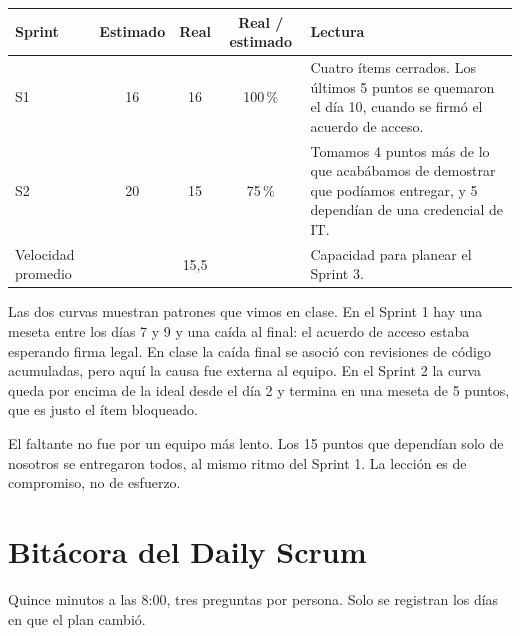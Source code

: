 \documentclass[10pt,a4paper]{article}
\begin{document}
\vspace{-8pt}
{\small
\begin{tabularx}{\linewidth}{@{}l c c c L@{}}
\toprule
Sprint & Estimado & Real & Real / estimado & Lectura \\
\midrule
S1 & 16 & 16 & 100\,\% & Cuatro ítems cerrados. Los últimos 5 puntos se quemaron el día 10, cuando se firmó el acuerdo de acceso. \\
S2 & 20 & 15 & 75\,\% & Tomamos 4 puntos más de lo que acabábamos de demostrar que podíamos entregar, y 5 dependían de una credencial de IT. \\
\midrule
Velocidad promedio & & 15,5 & & Capacidad para planear el Sprint 3. \\
\bottomrule
\end{tabularx}}

Las dos curvas muestran patrones que vimos en clase. En el Sprint 1 hay una meseta entre los días 7 y 9 y una caída
al final: el acuerdo de acceso estaba esperando firma legal. En clase la caída final se asoció con revisiones de
código acumuladas, pero aquí la causa fue externa al equipo. En el Sprint 2 la curva queda por encima de la ideal
desde el día 2 y termina en una meseta de 5 puntos, que es justo el ítem bloqueado.

El faltante no fue por un equipo más lento. Los 15 puntos que dependían solo de nosotros se entregaron todos, al
mismo ritmo del Sprint 1. La lección es de compromiso, no de esfuerzo.

\section{Bitácora del Daily Scrum}
Quince minutos a las 8:00, tres preguntas por persona. Solo se registran los días en que el plan cambió.
\end{document}

